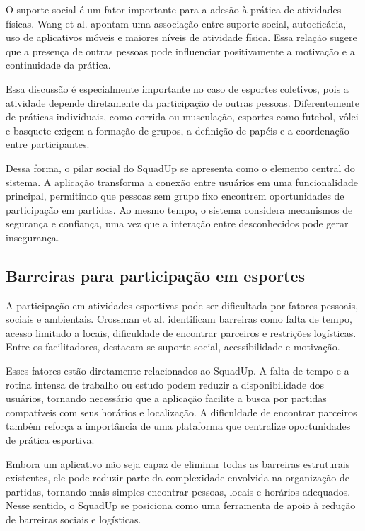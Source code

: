 \documentclass[a4paper, 12pt]{article}
\begin{document}
\begin{justify}
O suporte social é um fator importante para a adesão à prática de atividades físicas. Wang et al. \citep{wang_association_2019} apontam uma associação entre suporte social, autoeficácia, uso de aplicativos móveis e maiores níveis de atividade física. Essa relação sugere que a presença de outras pessoas pode influenciar positivamente a motivação e a continuidade da prática.

Essa discussão é especialmente importante no caso de esportes coletivos, pois a atividade depende diretamente da participação de outras pessoas. Diferentemente de práticas individuais, como corrida ou musculação, esportes como futebol, vôlei e basquete exigem a formação de grupos, a definição de papéis e a coordenação entre participantes.

Dessa forma, o pilar social do SquadUp se apresenta como o elemento central do sistema. A aplicação transforma a conexão entre usuários em uma funcionalidade principal, permitindo que pessoas sem grupo fixo encontrem oportunidades de participação em partidas. Ao mesmo tempo, o sistema considera mecanismos de segurança e confiança, uma vez que a interação entre desconhecidos pode gerar insegurança.

\subsection{Barreiras para participação em esportes}

A participação em atividades esportivas pode ser dificultada por fatores pessoais, sociais e ambientais. Crossman et al. \citep{crossman_facilitators_2024} identificam barreiras como falta de tempo, acesso limitado a locais, dificuldade de encontrar parceiros e restrições logísticas. Entre os facilitadores, destacam-se suporte social, acessibilidade e motivação.

Esses fatores estão diretamente relacionados ao SquadUp. A falta de tempo e a rotina intensa de trabalho ou estudo podem reduzir a disponibilidade dos usuários, tornando necessário que a aplicação facilite a busca por partidas compatíveis com seus horários e localização. A dificuldade de encontrar parceiros também reforça a importância de uma plataforma que centralize oportunidades de prática esportiva.

Embora um aplicativo não seja capaz de eliminar todas as barreiras estruturais existentes, ele pode reduzir parte da complexidade envolvida na organização de partidas, tornando mais simples encontrar pessoas, locais e horários adequados. Nesse sentido, o SquadUp se posiciona como uma ferramenta de apoio à redução de barreiras sociais e logísticas.


\end{justify}
\end{document}
